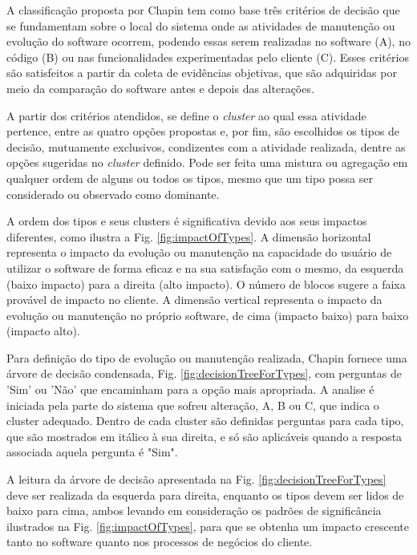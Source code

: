 A classificação proposta por Chapin tem como base três critérios de decisão que se fundamentam sobre o 
local do sistema onde as atividades de manutenção ou evolução do software ocorrem, podendo essas serem 
realizadas no software (A), no código (B) ou nas funcionalidades experimentadas pelo cliente (C). 
Esses critérios são satisfeitos a partir da coleta de evidências objetivas, que são adquiridas 
por meio da comparação do software antes e depois das alterações.

A partir dos critérios atendidos, se define o \textit{cluster} ao qual essa atividade pertence, 
entre as quatro opções propostas e, por fim, são escolhidos os tipos de decisão, mutuamente exclusivos, 
condizentes com a atividade realizada, dentre as opções sugeridas no \textit{cluster} definido. 
Pode ser feita uma mistura ou agregação em qualquer ordem de alguns ou todos os tipos, mesmo que 
um tipo possa ser considerado ou observado como dominante.

A ordem dos tipos e seus clusters é significativa devido aos seus impactos diferentes, como ilustra 
a Fig. \ref{fig:impactOfTypes}. A dimensão horizontal representa o impacto da evolução ou manutenção na capacidade do 
usuário de utilizar o software de forma eficaz e na sua satisfação com o mesmo, da esquerda 
(baixo impacto) para a direita (alto impacto). O número de blocos sugere a faixa provável de impacto 
no cliente. A dimensão vertical representa o impacto da evolução ou manutenção no próprio software, 
de cima (impacto baixo) para baixo (impacto alto).


Para definição do tipo de evolução ou manutenção realizada, Chapin fornece uma árvore de decisão 
condensada, Fig. \ref{fig:decisionTreeForTypes}, com perguntas de 'Sim' ou 'Não' que encaminham para a opção mais apropriada. 
A analise é iniciada pela parte do sistema que sofreu alteração, A, B ou C, que indica o cluster 
adequado. Dentro de cada cluster são definidas perguntas para cada tipo, que são mostrados em itálico 
à sua direita, e só são aplicáveis quando a resposta associada aquela pergunta é "Sim". 

A leitura da árvore de decisão apresentada na Fig. \ref{fig:decisionTreeForTypes} deve ser realizada da esquerda para direita, 
enquanto os tipos devem ser lidos de baixo para cima, ambos levando em consideração os padrões de 
significância ilustrados na Fig. \ref{fig:impactOfTypes}, para que se obtenha um impacto crescente tanto no software 
quanto nos processos de negócios do cliente.

